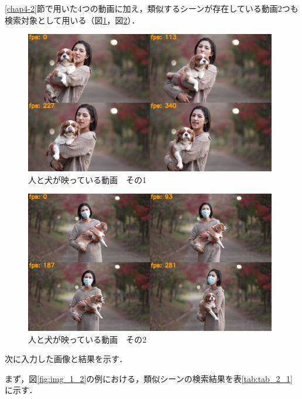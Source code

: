 \documentclass[a4j,12pt,dvipdfmx]{jreport}
\begin{document}
\ref{chap4-2}節で用いた4つの動画に加え，類似するシーンが存在している動画2つも検索対象として用いる（図\ref{fig:movie7}，図\ref{fig:movie8}）．
\begin{figure}[b]
  \centering
  \includegraphics[width=11cm]{image/7_result.jpg}
  \caption{人と犬が映っている動画　その1}
  \label{fig:movie7}
\end{figure}

\begin{figure}[b]
  \centering
  \includegraphics[width=11cm]{image/8_result.jpg}
  \caption{人と犬が映っている動画　その2}
  \label{fig:movie8}
\end{figure}

次に入力した画像と結果を示す．

まず，図\ref{fig:img_1_2}の例における，類似シーンの検索結果を表\ref{tab:tab_2_1}に示す．
\end{document}
